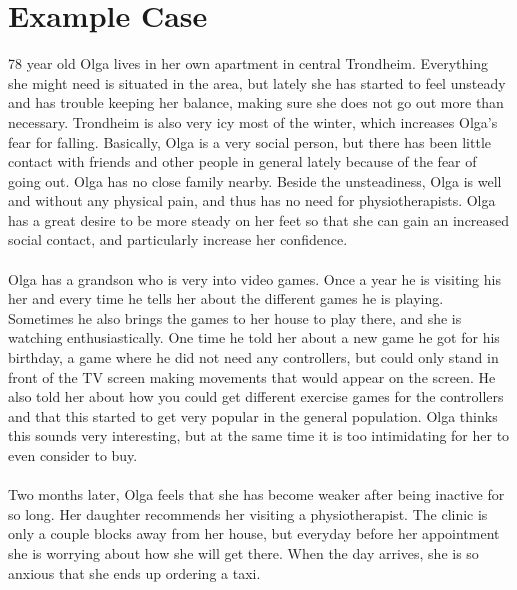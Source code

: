 \section{Example Case}
78 year old Olga lives in her own apartment in central Trondheim. Everything she might need is situated in the area, but lately she has started  to feel unsteady and has trouble keeping her balance, making sure she does not go out more than necessary. Trondheim is also very icy most of the winter, which increases Olga's fear for falling. Basically, Olga is a very social person, but there has been little contact with friends and other people in general lately because of the fear of going out. Olga has no close family nearby. Beside the unsteadiness, Olga is well and without any physical pain, and thus has no need for physiotherapists. Olga has a great desire to be more steady on her feet so that she can gain an increased social contact, and particularly increase her confidence. \\ \\
Olga has a grandson who is very into video games. Once a year he is visiting his her and every time he tells her about the different games he is playing. Sometimes he also brings the games to her house to play there, and she is watching enthusiastically. One time he told her about a new game he got for his birthday, a game where he did not need any controllers, but could only stand in front of the TV screen making movements that would appear on the screen. He also told her about how you could get different exercise games for the controllers and that this started to get very popular in the general population. Olga thinks this sounds very interesting, but at the same time it is too intimidating for her to even consider to buy.   \\ \\
Two months later, Olga feels that she has become weaker after being inactive for so long. Her daughter recommends her visiting a physiotherapist. The clinic is only a couple blocks away from her house, but everyday before her appointment she is worrying about how she will get there. When the day arrives, she is so anxious that she ends up ordering a taxi. \\ \\
